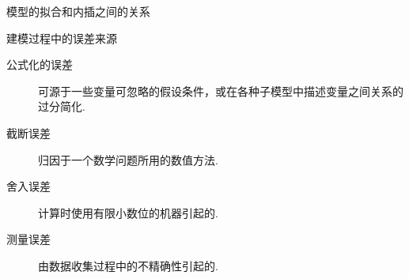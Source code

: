 \documentclass[UTF8]{ctexbeamer}
\begin{document}
\begin{frame}{模型的拟合和内插之间的关系}
\begin{figure}
  \end{figure}
\end{frame}

\begin{frame}{建模过程中的误差来源}

  \begin{description}
  \item[公式化的误差] 可源于一些变量可忽略的假设条件，或在各种子模型中描述变量之间关系的过分简化.
  \item[截断误差] 归因于一个数学问题所用的数值方法.
  \item[舍入误差] 计算时使用有限小数位的机器引起的.
  \item[测量误差] 由数据收集过程中的不精确性引起的.
  \end{description}

\end{frame}
\end{document}
